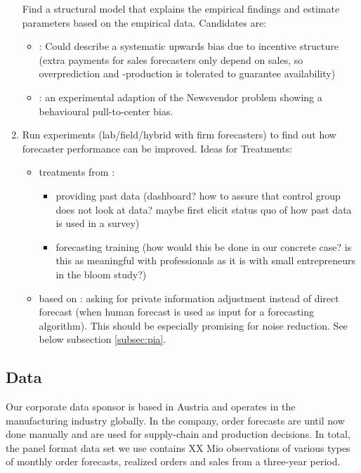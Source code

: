 \documentclass[12pt,a4paper]{article}
\begin{document}
\begin{enumerate}
Find a structural model that explains the empirical findings and estimate parameters based on the empirical data. Candidates are: 
	
	\begin{itemize}
		\item \cite{scheele2018designing}: Could describe a systematic upwards bias due to incentive structure (extra payments for sales forecasters only depend on sales, so overprediction and -production is tolerated to guarantee availability)
		\item \cite{ockenfels2014impulse}: an experimental adaption of the Newsvendor problem showing a behavioural pull-to-center bias.
	\end{itemize}

	\item Run experiments (lab/field/hybrid with firm forecasters) to find out how forecaster performance can be improved. Ideas for Treatments:

	\begin{itemize}
		\item treatments from \cite{bloom2022rationalizing}:
			\begin{itemize}
				\item providing past data (dashboard? how to assure that control group does not look at data? maybe first elicit status quo of how past data is used in a survey)
				\item forecasting training (how would this be done in our concrete case? is this as meaningful with professionals as it is with small entrepreneurs in the bloom study?)
			\end{itemize}
		\item based on \cite{ibrahim2021eliciting}: asking for private information adjustment instead of direct forecast (when human forecast is used as input for a forecasting algorithm). This should be especially promising for noise reduction. See below subsection \ref{subsec:pia}.
	\end{itemize}
	
\end{enumerate}

\subsection{Data}
\label{subsec:data}

Our corporate data sponsor is based in Austria and operates in the manufacturing industry globally. In the company, order forecasts are until now done manually and are used for supply-chain and production decisions. In total, the panel format data set we use contains XX Mio observations of various types of monthly order forecasts, realized orders and sales from a three-year period.     
\end{document}
